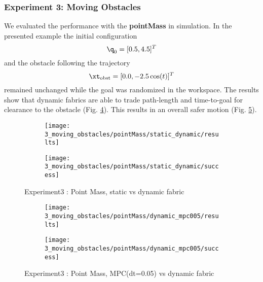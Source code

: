 \subsubsection{Experiment 3: Moving Obstacles}%
\label{app:sub:experiment_3_moving_obstacles}

We evaluated the performance with the \textbf{pointMass} in simulation. In the presented
example the initial configuration \[\q_0 = [0.5, 4.5]^T\] and the obstacle following the
trajectory \[\xt_{\textrm{obst}} = [0.0, -2.5\cos(t)]^T\] remained unchanged while the
goal was randomized in the workspace. The results show that dynamic fabrics are able to
trade path-length and time-to-goal for clearance to the obstacle (Fig.
\ref{subfig:experiment3_pointMass_static_dynamic_res}). This results in an
overall safer motion (Fig. \ref{subfig:experiment3_pointMass_static_dynamic_success}).

\begin{figure}[h]
  \centering
  \begin{subfigure}{0.7\linewidth}
    \centering
    \texttt{[image: 3\_moving\_obstacles/pointMass/static\_dynamic/results]}
    \caption{}
    \label{subfig:experiment3_pointMass_static_dynamic_res}
  \end{subfigure}%
  \begin{subfigure}{0.3\linewidth}
    \centering
    \texttt{[image: 3\_moving\_obstacles/pointMass/static\_dynamic/success]}
    \caption{}
    \label{subfig:experiment3_pointMass_static_dynamic_success}
  \end{subfigure}
  \caption{Experiment3 : Point Mass, static vs dynamic fabric}%
  \label{fig:experiment3_pointMass}
\end{figure}

\begin{figure}[h]
  \centering
  \begin{subfigure}{0.7\linewidth}
    \centering
    \texttt{[image: 3\_moving\_obstacles/pointMass/dynamic\_mpc005/results]}
    \caption{}
    \label{subfig:experiment3_pointMass_static_dynamic_res}
  \end{subfigure}%
  \begin{subfigure}{0.3\linewidth}
    \centering
    \texttt{[image: 3\_moving\_obstacles/pointMass/dynamic\_mpc005/success]}
    \caption{}
    \label{subfig:experiment3_pointMass_static_dynamic_success}
  \end{subfigure}
  \caption{Experiment3 : Point Mass, MPC(dt=0.05) vs dynamic fabric}%
  \label{fig:experiment3_pointMass}
\end{figure}

